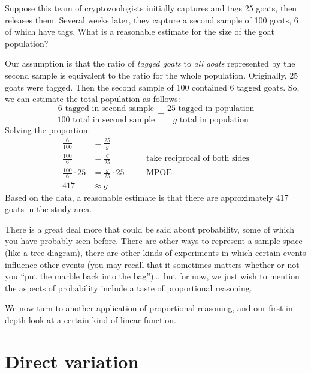 \begin{boxedex}
Suppose this team of cryptozoologists initially captures and tags 25 goats, then releases them. Several weeks later, they capture a second sample of 100 goats, 6 of which have tags. What is a reasonable estimate for the size of the goat population?

\bigskip{} Our assumption is that the ratio of \textit{tagged goats} to \textit{all goats} represented by the second sample is equivalent to the ratio for the whole population. Originally, 25 goats were tagged. Then the second sample of 100 contained 6 tagged goats. So, we can estimate the total population as follows:
\[\frac{6\text{ tagged in second sample}}{100\text{ total in second sample}} = \frac{25\text{ tagged in population}}{g \text{ total in population}}\]
Solving the proportion:
\[\begin{aligned}
\frac{6}{100} &= \frac{25}{g}
\\[2ex]
\frac{100}{6} &= \frac{g}{25}
&&\quad\text{take reciprocal of both sides}
\\[2ex]
\frac{100}{6} \cdot 25 &= \frac{g}{25} \cdot 25
&&\quad\text{MPOE}
\\[2ex]
417 &\approx g
\end{aligned}\]
Based on the data, a reasonable estimate is that there are approximately 417 goats in the study area.
\end{boxedex}

There is a great deal more that could be said about probability, some of which you have probably seen before. There are other ways to represent a sample space  (like a tree diagram), there are other kinds of experiments in which certain events influence other events (you may recall that it sometimes matters whether or not you ``put the marble back into the bag'')\ldots\ but for now, we just wish to mention the aspects of probability include a taste of proportional reasoning.

We now turn to another application of proportional reasoning, and our first in-depth look at a certain kind of linear function.

\section{Direct variation}
\label{sec:directvar}


